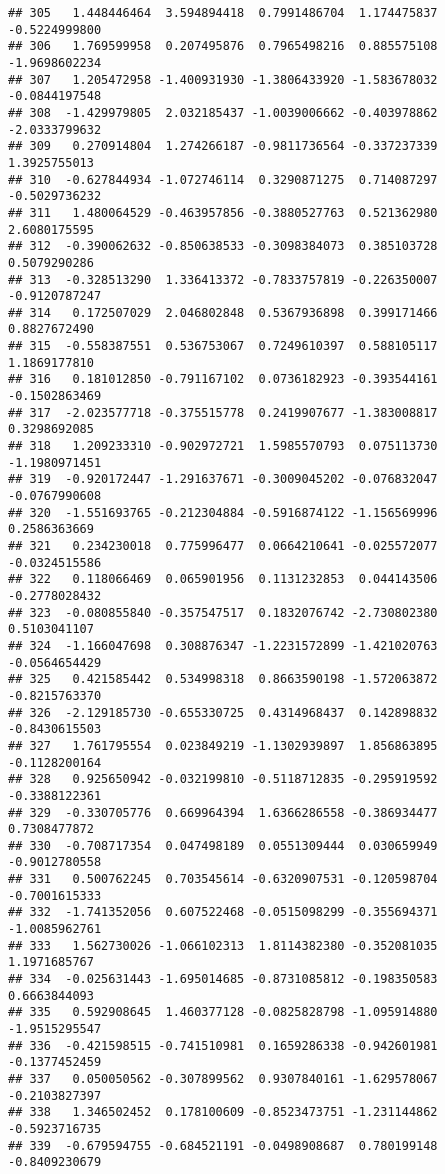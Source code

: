 \documentclass[
]{article}
\begin{document}
\begin{verbatim}
## 305   1.448446464  3.594894418  0.7991486704  1.174475837 -0.5224999800
## 306   1.769599958  0.207495876  0.7965498216  0.885575108 -1.9698602234
## 307   1.205472958 -1.400931930 -1.3806433920 -1.583678032 -0.0844197548
## 308  -1.429979805  2.032185437 -1.0039006662 -0.403978862 -2.0333799632
## 309   0.270914804  1.274266187 -0.9811736564 -0.337237339  1.3925755013
## 310  -0.627844934 -1.072746114  0.3290871275  0.714087297 -0.5029736232
## 311   1.480064529 -0.463957856 -0.3880527763  0.521362980  2.6080175595
## 312  -0.390062632 -0.850638533 -0.3098384073  0.385103728  0.5079290286
## 313  -0.328513290  1.336413372 -0.7833757819 -0.226350007 -0.9120787247
## 314   0.172507029  2.046802848  0.5367936898  0.399171466  0.8827672490
## 315  -0.558387551  0.536753067  0.7249610397  0.588105117  1.1869177810
## 316   0.181012850 -0.791167102  0.0736182923 -0.393544161 -0.1502863469
## 317  -2.023577718 -0.375515778  0.2419907677 -1.383008817  0.3298692085
## 318   1.209233310 -0.902972721  1.5985570793  0.075113730 -1.1980971451
## 319  -0.920172447 -1.291637671 -0.3009045202 -0.076832047 -0.0767990608
## 320  -1.551693765 -0.212304884 -0.5916874122 -1.156569996  0.2586363669
## 321   0.234230018  0.775996477  0.0664210641 -0.025572077 -0.0324515586
## 322   0.118066469  0.065901956  0.1131232853  0.044143506 -0.2778028432
## 323  -0.080855840 -0.357547517  0.1832076742 -2.730802380  0.5103041107
## 324  -1.166047698  0.308876347 -1.2231572899 -1.421020763 -0.0564654429
## 325   0.421585442  0.534998318  0.8663590198 -1.572063872 -0.8215763370
## 326  -2.129185730 -0.655330725  0.4314968437  0.142898832 -0.8430615503
## 327   1.761795554  0.023849219 -1.1302939897  1.856863895 -0.1128200164
## 328   0.925650942 -0.032199810 -0.5118712835 -0.295919592 -0.3388122361
## 329  -0.330705776  0.669964394  1.6366286558 -0.386934477  0.7308477872
## 330  -0.708717354  0.047498189  0.0551309444  0.030659949 -0.9012780558
## 331   0.500762245  0.703545614 -0.6320907531 -0.120598704 -0.7001615333
## 332  -1.741352056  0.607522468 -0.0515098299 -0.355694371 -1.0085962761
## 333   1.562730026 -1.066102313  1.8114382380 -0.352081035  1.1971685767
## 334  -0.025631443 -1.695014685 -0.8731085812 -0.198350583  0.6663844093
## 335   0.592908645  1.460377128 -0.0825828798 -1.095914880 -1.9515295547
## 336  -0.421598515 -0.741510981  0.1659286338 -0.942601981 -0.1377452459
## 337   0.050050562 -0.307899562  0.9307840161 -1.629578067 -0.2103827397
## 338   1.346502452  0.178100609 -0.8523473751 -1.231144862 -0.5923716735
## 339  -0.679594755 -0.684521191 -0.0498908687  0.780199148 -0.8409230679

\end{verbatim}
\end{document}
